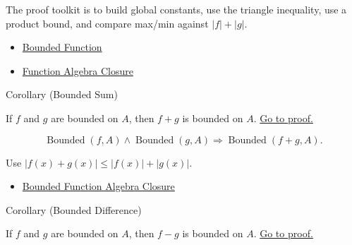 \begin{remark*}[Interpretation]
The proof toolkit is to build global constants, use the triangle inequality,
use a product bound, and compare max/min against \(|f|+|g|\).
\end{remark*}

\begin{dependencies}
\begin{itemize}
  \item \hyperref[def:function-bounded]{Bounded Function}
  \item \hyperref[thm:function-algebra-closure]{Function Algebra Closure}
\end{itemize}
\end{dependencies}

\begin{corollarybox}{Corollary (Bounded Sum)}
\begin{corollary}
\label{cor:bounded-sum}
If \(f\) and \(g\) are bounded on \(A\), then \(f+g\) is bounded on \(A\).
\hyperref[prf:bounded-sum]{Go to proof.}
\end{corollary}
\end{corollarybox}

\begin{remark*}
\[
  \operatorname{Bounded}(f,A)\wedge\operatorname{Bounded}(g,A)
  \Rightarrow \operatorname{Bounded}(f+g,A).
\]
\end{remark*}

\begin{remark*}[Interpretation]
Use \(|f(x)+g(x)|\leq |f(x)|+|g(x)|\).
\end{remark*}

\begin{dependencies}
\begin{itemize}
  \item \hyperref[thm:bounded-function-algebra-closure]{Bounded Function Algebra Closure}
\end{itemize}
\end{dependencies}

\begin{corollarybox}{Corollary (Bounded Difference)}
\begin{corollary}
\label{cor:bounded-difference}
If \(f\) and \(g\) are bounded on \(A\), then \(f-g\) is bounded on \(A\).
\hyperref[prf:bounded-difference]{Go to proof.}
\end{corollary}
\end{corollarybox}

